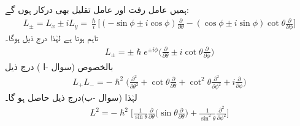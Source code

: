 ہمیں عامل رفت اور عامل تقلیل بھی درکار ہوں گے: 
\begin{align*}
L_{\pm} = L_x \pm i L_y = \frac{\hslash}{i} \big [ (- \sin \phi \pm i \cos \phi) \frac{\partial}{\partial \theta} - (\cos \phi \pm i \sin \phi) \cot \theta \frac{\partial}{\partial \phi} \big ]
\end{align*}
تاہم  ہوتا ہے لہٰذا درج ذیل ہوگا۔
\begin{align}\label{مساوات_تین_ابعادی_سیڑھی_عاملین}
L_{\pm} = \pm \hslash e^{\pm i \phi} \big ( \frac{\partial}{\partial \theta} \pm i \cot \theta \frac{\partial}{\partial \phi} \big )
\end{align}
بالخصوص (سوال -ا ) درج ذیل 
\begin{align}\label{مساوات_تین_ابعادی_سیڑھی_عاملین_آگے_پیچے}
L_{+} L_{-} = - \hslash^2 \big ( \frac{\partial^2}{\partial \theta^2} + \cot \theta \frac{\partial}{\partial \theta} + \cot^2 \theta \frac{\partial^2}{\partial \phi^2} + i \frac{\partial}{\partial \phi} \big )
\end{align}
لہٰذا (سوال -ب)درج ذیل حاصل ہو گا۔
\begin{align}\label{مساوات_تین_ابعادی_مربع_معیار_حرکت}
L^2 = - \hslash^2 \big [ \frac{1}{\sin \theta} \frac{\partial}{\partial \theta} \big ( \sin \theta \frac{\partial}{\partial \theta} \big ) + \frac{1}{\sin^2 \theta} \frac{\partial^2}{\partial \phi^2} \big ]
\end{align}

